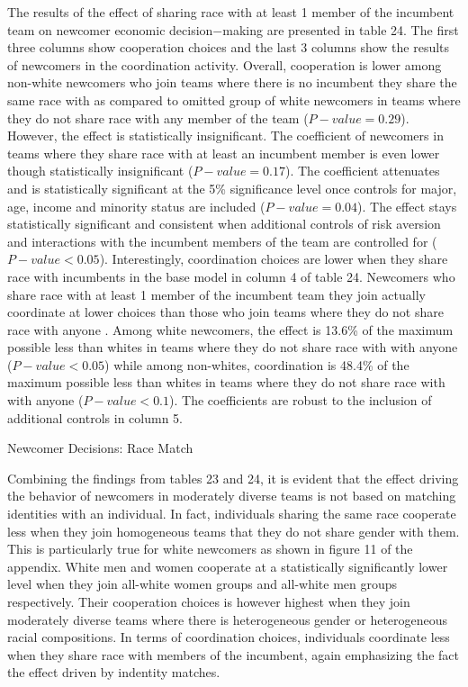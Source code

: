 The results of the effect of sharing race with at least 1 member of the incumbent team on newcomer economic decision$-$making are presented in table 24. The first three columns show cooperation choices and the last 3 columns show the results of newcomers in the coordination activity. Overall, cooperation is lower among non-white newcomers who join teams where there is no incumbent they share the same race with as compared to omitted group of white newcomers in teams where they do not share race with any member of the team ($P-value=0.29$).  However, the effect is statistically insignificant. The coefficient of newcomers in teams where they share race with at least an incumbent member is even lower though statistically insignificant ($P-value=0.17$). The coefficient attenuates and is statistically significant at the 5\% significance level once controls for major, age, income and minority status are included ($P-value=0.04$). The effect stays statistically significant and consistent when additional controls of risk aversion and interactions with the incumbent members of the team are controlled for ($P-value<0.05$). Interestingly, coordination choices are lower when they share race with incumbents in the base model in column 4 of table 24. Newcomers who share race with at least 1 member of the incumbent team they join actually coordinate at lower choices than those who join teams where they do not share race with anyone . Among white newcomers, the effect is 13.6\% of the maximum possible less than whites in teams where they do not share race with with anyone ($P-value<0.05$) while among non-whites, coordination is 48.4\% of the maximum possible less than whites in teams where they do not share race with with anyone ($P-value<0.1$). The coefficients are robust to the inclusion of additional controls in column 5.  


\begin{table}[H]
 \captionsetup{justification=raggedright,singlelinecheck=false}
\caption{Newcomer Decisions: Race Match} \label{tab:tablea1}
    \begin{center}
        
    \end{center}
\end{table}

Combining the findings from tables 23 and 24, it is evident that the effect driving the behavior of newcomers in moderately diverse teams is not based on matching identities with an individual. In fact, individuals sharing the same race cooperate less when they join homogeneous teams that they do not share gender with them. This is particularly true for white newcomers as shown in figure 11 of the appendix. White men and women cooperate at a statistically significantly lower level when they join all-white women groups and all-white men groups respectively. Their cooperation choices is however highest when they join moderately diverse teams where there is heterogeneous gender or heterogeneous racial compositions. In terms of coordination choices, individuals coordinate less when they share race with members of the incumbent, again emphasizing the fact the effect driven by indentity matches. 



